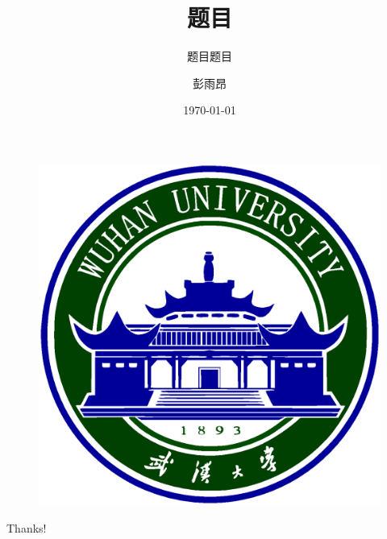 \documentclass[xcolor=table]{beamer}
\author{彭雨昂}
\title{题目}
\subtitle{题目题目}
\institute{武汉大学国家网络安全学院}
\date{\today}
\begin{document}
\kaishu
\begin{frame}
	\titlepage
	\begin{figure}[htpb]
		\begin{center}
			\includegraphics[width=0.2\linewidth]{pic/whulogo.eps}
		\end{center}
	\end{figure}
\end{frame}
\begin{frame}
\tableofcontents[sectionstyle=show,subsectionstyle=show/shaded/hide,subsubsectionstyle=show/shaded/hide]
\end{frame}












\begin{frame}
\begin{center}
{\Huge Thanks!}
\end{center}
\end{frame}
\end{document}
